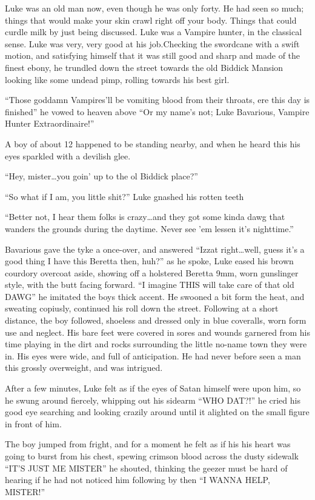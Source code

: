 Luke was an old man now, even though he was only forty. He had seen
so much; things that would make your skin crawl right off your
body. Things that could curdle milk by just being discussed. Luke
was a Vampire hunter, in the classical sense. Luke was very, very
good at his job.Checking the swordcane with a swift motion, and
satisfying himself that it was still good and sharp and made of the
finest ebony, he trundled down the street towards the old Biddick
Mansion looking like some undead pimp, rolling towards his best
girl.

``Those goddamn Vampires'll be vomiting blood from their throats,
ere this day is finished'' he vowed to heaven above ``Or my name's
not; Luke Bavarious, Vampire Hunter Extraordinaire!''

A boy of about 12 happened to be standing nearby, and when he heard
this his eyes sparkled with a devilish glee.

``Hey, mister{\ldots}you goin' up to the ol Biddick place?''

``So what if I am, you little shit?'' Luke gnashed his rotten
teeth

``Better not, I hear them folks is crazy{\ldots}and they got some kinda
dawg that wanders the grounds during the daytime. Never see 'em
lessen it's nighttime.''

Bavarious gave the tyke a once-over, and answered ``Izzat
right{\ldots}well, guess it's a good thing I have this Beretta then,
huh?'' as he spoke, Luke eased his brown courdory overcoat aside,
showing off a holstered Beretta 9mm, worn gunslinger style, with
the butt facing forward. ``I imagine THIS will take care of that old
DAWG'' he imitated the boys thick accent. He swooned a bit form the
heat, and sweating copiusly, continued his roll down the street.
Following at a short distance, the boy followed, shoeless and
dressed only in blue coveralls, worn form use and neglect. His bare
feet were covered in sores and wounds garnered from his time
playing in the dirt and rocks surrounding the little no-name town
they were in. His eyes were wide, and full of anticipation. He had
never before seen a man this grossly overweight, and was
intrigued.

After a few minutes, Luke felt as if the eyes of Satan himself were
upon him, so he swung around fiercely, whipping out his sidearm
``WHO DAT?!'' he cried his good eye searching and looking crazily
around until it alighted on the small figure in front of him.

The boy jumped from fright, and for a moment he felt as if his his
heart was going to burst from his chest, spewing crimson blood
across the dusty sidewalk ``IT'S JUST ME MISTER'' he shouted,
thinking the geezer must be hard of hearing if he had not noticed
him following by then ``I WANNA HELP, MISTER!''

